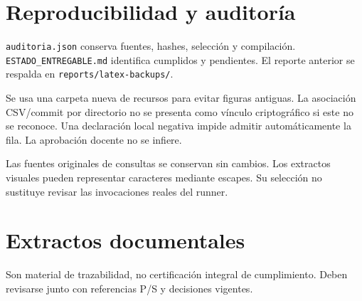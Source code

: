\section{Reproducibilidad y auditoría}
\texttt{auditoria.json} conserva fuentes, hashes, selección y compilación.
\texttt{ESTADO\_ENTREGABLE.md} identifica cumplidos y pendientes.
El reporte anterior se respalda en \texttt{reports/latex-backups/}.

Se usa una carpeta nueva de recursos para evitar figuras antiguas.
La asociación CSV/commit por directorio no se presenta como vínculo
criptográfico si este no se reconoce. Una declaración local negativa
impide admitir automáticamente la fila. La aprobación docente no se infiere.

Las fuentes originales de consultas se conservan sin cambios. Los
extractos visuales pueden representar caracteres mediante escapes.
Su selección no sustituye revisar las invocaciones reales del runner.

\section{Extractos documentales}
Son material de trazabilidad, no certificación integral de cumplimiento.
Deben revisarse junto con referencias P/S y decisiones vigentes.

